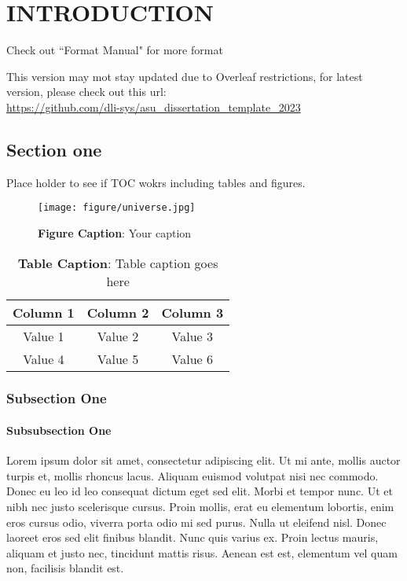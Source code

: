 \fancyhf{}
\fancyfoot[CO, CE]{ \thepage}

\chapter{INTRODUCTION}
\label{Introduction}
Check out ``Format Manual" for more format\cite{asu2023}

This version may mot stay updated due to Overleaf restrictions, for latest version, please check out this url: \\ \url{https://github.com/dli-sys/asu_dissertation_template_2023}

\section{Section one}
Place holder to see if TOC wokrs including tables and figures.

\begin{figure}[htbp]
\centering
\texttt{[image: figure/universe.jpg]}
\caption[Figure Caption]{ \centering \textbf{Figure Caption}: Your caption}
\label{fig:universe}
\end{figure}


\begin{table}[h!]
    \centering
    \begin{adjustbox}{width=0.5\textwidth}
        \begin{tabular}{|c|c|c|}\hline
            \multicolumn{1}{|c|}{\textbf{Column 1}} & \multicolumn{1}{c|}{\textbf{Column 2}} & \multicolumn{1}{c|}{\textbf{Column 3}} \\ \hline
            Value 1 & Value 2 & Value 3 \\ \hline
            Value 4 & Value 5 & Value 6 \\ \hline
        \end{tabular}
    \end{adjustbox}
    \caption[Table Caption]{\centering \textbf{Table Caption}: Table caption goes here}
    \label{table:test}
\end{table}


\subsection{Subsection One}
\subsubsection{Subsubsection One}
Lorem ipsum dolor sit amet, consectetur adipiscing elit. Ut mi ante, mollis auctor turpis et, mollis rhoncus lacus. Aliquam euismod volutpat nisi nec commodo. Donec eu leo id leo consequat dictum eget sed elit. Morbi et tempor nunc. Ut et nibh nec justo scelerisque cursus. Proin mollis, erat eu elementum lobortis, enim eros cursus odio, viverra porta odio mi sed purus. Nulla ut eleifend nisl. Donec laoreet eros sed elit finibus blandit. Nunc quis varius ex. Proin lectus mauris, aliquam et justo nec, tincidunt mattis risus. Aenean est est, elementum vel quam non, facilisis blandit est.

